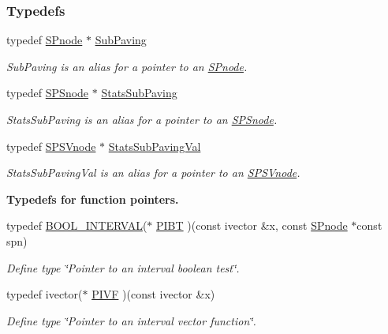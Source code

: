 \subsubsection*{\-Typedefs}
\begin{DoxyCompactItemize}
\item 
typedef \hyperlink{classsubpavings_1_1SPnode}{\-S\-Pnode} $\ast$ \hyperlink{namespacesubpavings_a7e50e3fe54ef41646fbb6155160805cc}{\-Sub\-Paving}
\begin{DoxyCompactList}\small\item\em \-Sub\-Paving is an alias for a pointer to an \hyperlink{classsubpavings_1_1SPnode}{\-S\-Pnode}. \end{DoxyCompactList}\item 
typedef \hyperlink{classsubpavings_1_1SPSnode}{\-S\-P\-Snode} $\ast$ \hyperlink{namespacesubpavings_ace6b16f0adf0db13eeb38e124d5328c6}{\-Stats\-Sub\-Paving}
\begin{DoxyCompactList}\small\item\em \-Stats\-Sub\-Paving is an alias for a pointer to an \hyperlink{classsubpavings_1_1SPSnode}{\-S\-P\-Snode}. \end{DoxyCompactList}\item 
typedef \hyperlink{classsubpavings_1_1SPSVnode}{\-S\-P\-S\-Vnode} $\ast$ \hyperlink{namespacesubpavings_a2ef81a0baf365fed575183b748d8b8ff}{\-Stats\-Sub\-Paving\-Val}
\begin{DoxyCompactList}\small\item\em \-Stats\-Sub\-Paving\-Val is an alias for a pointer to an \hyperlink{classsubpavings_1_1SPSVnode}{\-S\-P\-S\-Vnode}. \end{DoxyCompactList}\end{DoxyCompactItemize}
\begin{Indent}{\bf \-Typedefs for function pointers.}\par
\begin{DoxyCompactItemize}
\item 
typedef \hyperlink{namespacesubpavings_abf44b15764c504d6ffa87c62b45b01a6}{\-B\-O\-O\-L\-\_\-\-I\-N\-T\-E\-R\-V\-A\-L}($\ast$ \hyperlink{namespacesubpavings_a4ca48fac31a3dcc26d5b51b1ee3cd0d9}{\-P\-I\-B\-T} )(const ivector \&x, const \hyperlink{classsubpavings_1_1SPnode}{\-S\-Pnode} $\ast$const spn)
\begin{DoxyCompactList}\small\item\em \-Define type \char`\"{}\-Pointer to an interval boolean test\char`\"{}. \end{DoxyCompactList}\item 
typedef ivector($\ast$ \hyperlink{namespacesubpavings_af9ec133810ddce70b48381d444e2ec22}{\-P\-I\-V\-F} )(const ivector \&x)
\begin{DoxyCompactList}\small\item\em \-Define type \char`\"{}\-Pointer to an interval vector function\char`\"{}. \end{DoxyCompactList}\end{DoxyCompactItemize}
\end{Indent}
